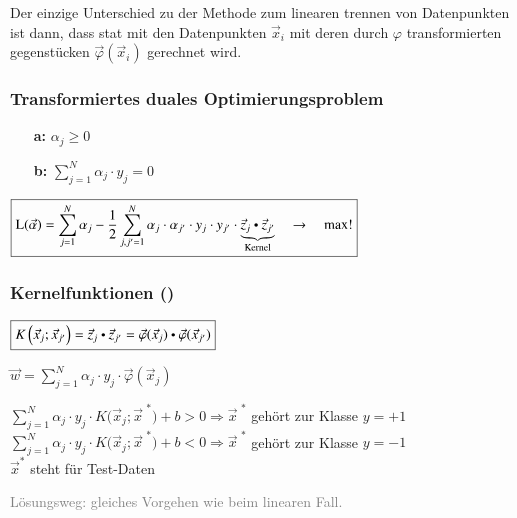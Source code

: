 Der einzige Unterschied zu der Methode zum linearen trennen von Datenpunkten ist dann, dass stat mit den Datenpunkten $\vec{x}_i$ mit deren durch $\varphi$ transformierten gegenstücken $\vec{\varphi}(\vec{x}_i)$ gerechnet wird.

\subsubsection{Transformiertes duales Optimierungsproblem}
    \begin{itemize}
        \item [\textbf{a:}] $\boxed{\alpha_j\geq0}$
        \item [\textbf{b:}] $\boxed{\sum_{j=1}^N\alpha_j \cdot y_j=0}$
    \end{itemize}
$\boxed{\mathrm{L}(\vec{\alpha})=\sum_{j=1}^N\alpha_j-\frac{1}{2}\sum_{j,j'=1}^N\alpha_j \cdot \alpha_{j'} \cdot \space y_j \cdot y_{j'} \cdot \space \underbrace{\vec{z}_j \dotp  \vec{z}_{j'}}_{\text{Kernel}} \quad\to\quad\max!}$

\subsubsection{Kernelfunktionen ()}
$\boxed{K\left( \vec{x}_j ; \vec{x}_{j'}\right) = \vec{z}_j \dotp \vec{z}_{j'}=\vec{\varphi}(\vec{x}_j) \dotp \vec{\varphi}(\vec{x}_{j'})}$

$\boxed{\vec{w}=\sum_{j=1}^N\alpha_j \cdot y_j \cdot \vec{\varphi}(\vec{x}_j)}$

$\boxed{\sum_{j=1}^N\alpha_j \cdot y_j \cdot K\Big(\vec{x}_j;\vec{x}^{\text{ *}} \Big)+b>0\Longrightarrow\vec{x}^{\text{ *}}}$ gehört zur Klasse $y = +1$\\
$\boxed{\sum_{j=1}^N\alpha_j \cdot y_j \cdot K\Big(\vec{x}_j;\vec{x}^{\text{ *}} \Big)+b<0\Longrightarrow\vec{x}^{\text{ *}}}$ gehört zur Klasse $y = -1$\\
$\vec{x}^*$ steht für Test-Daten

\medskip
\textcolor{gray}{Lösungsweg: gleiches Vorgehen wie beim linearen Fall.}

